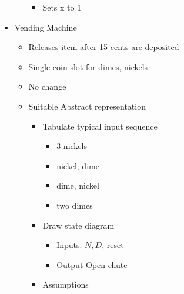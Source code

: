 \begin{itemize}
\begin{itemize}
        \begin{itemize}

          \item Sets x to 1

        \end{itemize}

    \end{itemize}

  \item Vending Machine

    \begin{itemize}

      \item Releases item after 15 cents are deposited

      \item Single coin slot for dimes, nickels

      \item No change

      \item Suitable Abstract representation

        \begin{itemize}

          \item Tabulate typical input sequence

            \begin{itemize}

              \item 3 nickels

              \item nickel, dime

              \item dime, nickel

              \item two dimes

            \end{itemize}

          \item Draw state diagram

            \begin{itemize}

              \item Inputs: $N,D$, reset

              \item Output Open chute

            \end{itemize}

          \item Assumptions


\end{itemize}
\end{itemize}
\end{itemize}
